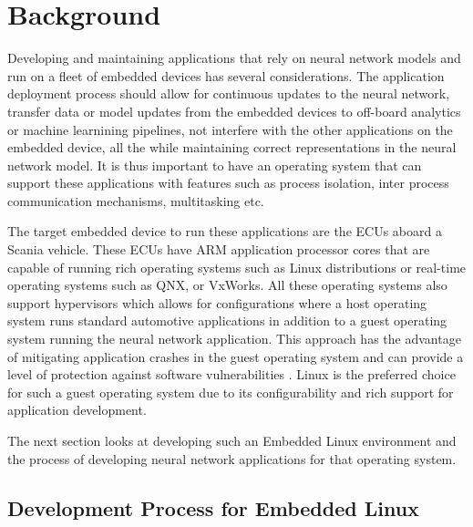 
\chapter{Background}

Developing and maintaining applications that rely on neural network models and run on a fleet of embedded devices has several considerations. The application deployment process should allow for continuous updates to the neural network, transfer data or model updates from the embedded devices to off-board analytics or machine learnining pipelines, not interfere with the other applications on the embedded device, all the while maintaining correct representations in the neural network model. It is thus important to have an operating system that can support these applications with features such as process isolation, inter process communication mechanisms, multitasking etc.

The target embedded device to run these applications are the ECUs aboard a Scania vehicle. These ECUs have ARM application processor cores that are capable of running rich operating systems such as Linux distributions or real-time operating systems such as QNX, or VxWorks. All these operating systems also support hypervisors which allows for configurations where a host operating system runs standard automotive applications in addition to a guest operating system running the neural network application. This approach has the advantage of mitigating application crashes in the guest operating system and can provide a level of protection against software vulnerabilities \cite{Linux-guest-os}. Linux is the preferred choice for such a guest operating system due to its configurability and rich support for application development.

The next section looks at developing such an Embedded Linux environment and the process of developing neural network applications for that operating system.

\section{Development Process for Embedded Linux}

